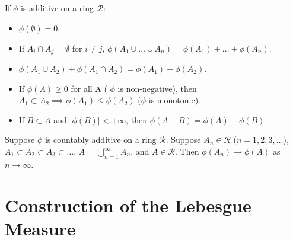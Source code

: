 \begin{remark}
  \label{rem:chap11:additive_properties}
  If $\phi$ is additive on a ring $\mathcal{R}$:
  \begin{itemize}
    \item $\phi(\emptyset) = 0$.
    \item If $A_i \cap A_j = \emptyset$ for $i \ne j$, $\phi(A_1 \cup
      \dots \cup A_n) = \phi(A_1) + \dots + \phi(A_n)$.
    \item $\phi(A_1 \cup A_2) + \phi(A_1 \cap A_2) = \phi(A_1) + \phi(A_2)$.
    \item If $\phi(A) \ge 0$ for all A ( $\phi$ is non-negative),
      then $A_1 \subset A_2 \implies \phi(A_1) \le \phi(A_2)$ ($\phi$
      is monotonic).
    \item If $B \subset A$ and $|\phi(B)| < +\infty$, then $\phi(A-B)
      = \phi(A) - \phi(B)$.
  \end{itemize}
\end{remark}

\begin{theorem}
  \label{thm:chap11:measure_continuity_increasing}
  Suppose $\phi$ is countably additive on a ring $\mathcal{R}$.
  Suppose $A_n \in \mathcal{R}$ ($n=1, 2, 3, \dots$), $A_1 \subset
  A_2 \subset A_3 \subset \dots$, $A = \bigcup_{n=1}^\infty A_n$, and
  $A \in \mathcal{R}$. Then $\phi(A_n) \to \phi(A)$ as $n \to \infty$.
\end{theorem}



\section{Construction of the Lebesgue Measure}

